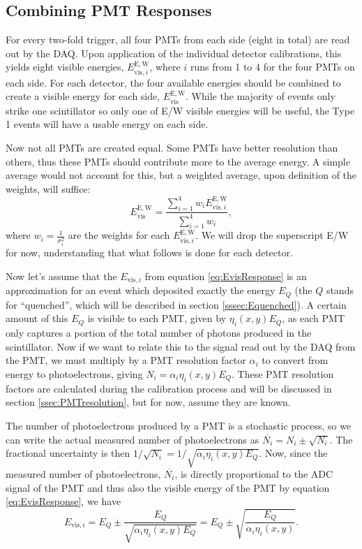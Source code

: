 \subsection{Combining PMT Responses}

For every two-fold trigger, all four PMTs from each side (eight in total) are read out by the
DAQ. Upon application of the individual detector calibrations, this yields
eight visible energies, $E_{\mathrm{vis},i}^\mathrm{E,W}$, where $i$ runs from 1 to 4 for the
four PMTs on each side. For each detector, the four available energies should
be combined to create a visible energy for each side, $E_{\mathrm{vis}}^\mathrm{E,W}$. While the
majority of events only strike one scintillator so only one of E/W visible energies will
be useful, the Type 1 events will have a usable energy on each side.

Now not all PMTs are created equal. Some PMTs have better resolution than others, thus these PMTs
should contribute more to the average energy. A simple average would not account for this, but
a weighted average, upon definition of the weights, will suffice:
%
\begin{equation}
  E_{\mathrm{vis}}^\mathrm{E,W} = \frac{\sum_{i=1}^{4} w_i E_{\mathrm{vis},i}^{\mathrm{E,W}}}{\sum_{i=1}^{4} w_i},
\end{equation}
%
where $w_i=\frac{1}{\sigma_i^2}$ are the weights for each $E_{\mathrm{vis},i}^{\mathrm{E,W}}$. We will drop the superscript
E/W for now, understanding that what follows is done for each detector.

Now let's assume that the $E_{\mathrm{vis},i}$ from equation \ref{eq:EvisResponse} is an approximation
for an event which deposited exactly the energy $E_Q$ (the $Q$ stands for ``quenched'', which will
be described in section \ref{sssec:Equenched}). A certain amount of this $E_Q$ is visible to each
PMT, given by $\eta_i(x,y)E_Q$, as each PMT only captures a portion of the total number of photons produced
in the scintillator.
Now if we want to relate this to the signal read out by the DAQ
from the PMT, we must multiply by a PMT resolution factor $\alpha_i$ to convert from energy
to photoelectrons, giving $N_i = \alpha_i \eta_i(x,y) E_Q$.
These PMT resolution factors are calculated during the calibration process
and will be discussed in section \ref{ssec:PMTresolution}, but for now, assume they are known.

The number of photoelectrons produced by a PMT is a stochastic process, so we can write the actual
measured number of photoelectrons as $\overline{N_i} = N_i \pm \sqrt{N_i}$. The fractional uncertainty
is then $1/\sqrt{N_i} = 1/\sqrt{\alpha_i \eta_i(x,y) E_Q}$. Now, since the measured number of photoelectrons,
$\overline{N_i}$, is directly proportional to the ADC signal of the PMT and thus also the visible energy
of the PMT by equation \ref{eq:EvisResponse}, we have
%
\begin{equation}
  E_{\mathrm{vis},i} = E_Q \pm \frac{E_Q}{\sqrt{\alpha_i \eta_i(x,y) E_Q}} =  E_Q \pm \sqrt{\frac{E_Q}{\alpha_i \eta_i(x,y)}}.
\end{equation}
%

